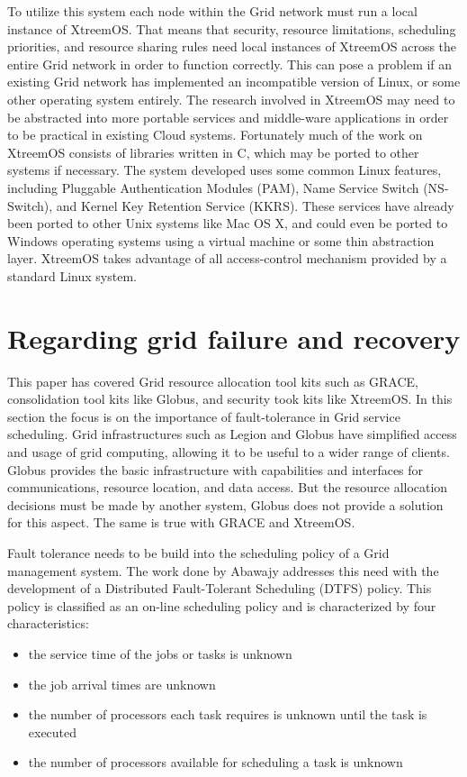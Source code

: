 \documentclass[conference]{IEEEtran}
\begin{document}
To utilize this system each node within the Grid network must run a local instance of XtreemOS. That means that security, resource limitations, scheduling priorities, and resource sharing rules need local instances of XtreemOS across the entire Grid network in order to function correctly. This can pose a problem if an existing Grid network has implemented an incompatible version of Linux, or some other operating system entirely. The research involved in XtreemOS may need to be abstracted into more portable services and middle-ware applications in order to be practical in existing Cloud systems. Fortunately much of the work on XtreemOS consists of libraries written in C, which may be ported to other systems if necessary. The system developed uses some common Linux features, including Pluggable Authentication Modules (PAM), Name Service Switch (NS-Switch), and Kernel Key Retention Service (KKRS). These services have already been ported to other Unix systems like Mac OS X, and could even be ported to Windows operating systems using a virtual machine or some thin abstraction layer. XtreemOS takes advantage of all access-control mechanism provided by a standard Linux system. 


\section{\textbf{Regarding grid failure and recovery}}
This paper has covered Grid resource allocation tool kits such as GRACE, consolidation tool kits like Globus, and security took kits like XtreemOS. In this section the focus is on the importance of fault-tolerance in Grid service scheduling. Grid infrastructures such as Legion and Globus have simplified access and usage of grid computing, allowing it to be useful to a wider range of clients. Globus provides the basic infrastructure with capabilities and interfaces for communications, resource location, and data access. But the resource allocation decisions must be made by another system, Globus does not provide a solution for this aspect. The same is true with GRACE and XtreemOS. 

Fault tolerance needs to be build into the scheduling policy of a Grid management system. The work done by Abawajy addresses this need with the development of a Distributed Fault-Tolerant Scheduling (DTFS) policy. \cite{faulttolerant} This policy is classified as an on-line scheduling policy and is characterized by four characteristics:

\begin{itemize}
\item the service time of the jobs or tasks is unknown
\item the job arrival times are unknown
\item the number of processors each task requires is unknown until the task is executed
\item the number of processors available for scheduling a task is unknown 
\end{itemize}
\end{document}
